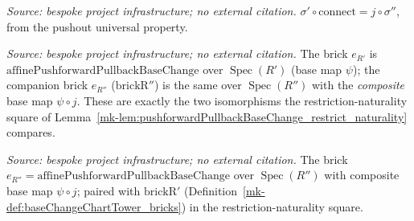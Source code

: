 \begin{lemma}\label{mk-lem:baseChangeChartTower_inr_connect}
  \leanok

  \textit{Source: bespoke project infrastructure; no external citation.}
  \(\sigma' \circ \mathrm{connect} = j \circ \sigma''\), from the pushout
  universal property.
\end{lemma}

\begin{definition}\label{mk-def:baseChangeChartTower_bricks}
  \leanok

  \textit{Source: bespoke project infrastructure; no external citation.}
  The brick \(e_{R'}\) is \(\mathrm{affinePushforwardPullbackBaseChange}\) over
  \(\operatorname{Spec}(R')\) (base map \(\psi\)); the companion brick \(e_{R''}\)
  (\(\mathrm{brickR''}\)) is the same over \(\operatorname{Spec}(R'')\) with the
  \emph{composite} base map \(\psi \circ j\). These are exactly the two isomorphisms the
  restriction-naturality square of
  Lemma~\ref{mk-lem:pushforwardPullbackBaseChange_restrict_naturality} compares.
\end{definition}

\begin{definition}\label{mk-def:baseChangeChartTower_brickRpp}
  \leanok

  \textit{Source: bespoke project infrastructure; no external citation.}
  The brick \(e_{R''} = \mathrm{affinePushforwardPullbackBaseChange}\) over
  \(\operatorname{Spec}(R'')\) with composite base map \(\psi \circ j\); paired with
  \(\mathrm{brickR'}\) (Definition~\ref{mk-def:baseChangeChartTower_bricks}) in the
  restriction-naturality square.
\end{definition}

